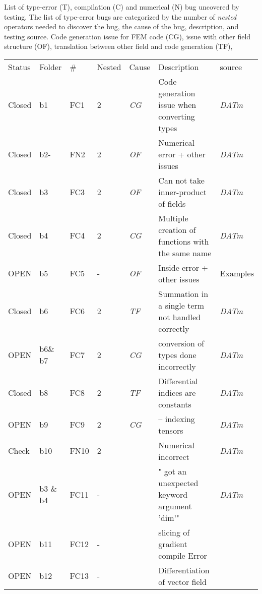 \documentclass{article}
\newcommand{\fontit}[1]{\textit{#1}}
\newcommand{\checkname}[0]{\textit{DATm}}
\begin{document}
List of type-error (T), compilation (C) and numerical (N) bug uncovered by testing.
 The list of type-error bugs are categorized by the number of \fontit{nested} operators needed to discover the bug,  the cause of the bug, description, and testing source.
 Code generation issue for FEM code (CG), issue with other field structure (OF), translation between other field and code generation (TF),
\newline 
\begin{tabular}{|ll|llll|l|}
\hline
Status & Folder&\# &Nested & Cause & Description & source\\
Closed& b1 & FC1 &2&\fontit{CG}&Code generation issue when converting types&\checkname{}\\
Closed &b2- & FN2 &2&\fontit{OF}&Numerical error + other issues&\checkname{}\\
Closed&b3  & FC3 &2&\fontit{OF}& Can not take inner-product of fields&\checkname{} \\
Closed&b4  & FC4 &2&\fontit{CG}&Multiple creation of functions with the same name &\checkname{}\\
OPEN&b5 &FC5 &-&\fontit{OF}& Inside error + other issues& Examples\\
Closed &b6 &FC6 &2&\fontit{TF} &  Summation in a single term not handled correctly & \checkname{}\\
OPEN& b6\& b7 &FC7 &2& \fontit{CG}& conversion of types done incorrectly & \checkname{}\\
Closed &b8 &FC8 &2&  \fontit{TF}&Differential indices are constants& \checkname{}\\
OPEN&b9 &FC9 &2&  \fontit{CG}&-- indexing tensors& \checkname{}\\
Check &b10 &FN10 &2&  &Numerical incorrect& \checkname{}\\
OPEN & b3 \& b4 & FC11 & -& &" got an unexpected keyword argument 'dim'"& \checkname{}\\
OPEN & b11 & FC12 &-& &slicing of gradient compile Error\\
OPEN & b12 & FC13 &-& &Differentiation of vector field\\
\hline
\end{tabular}

\end{document}
